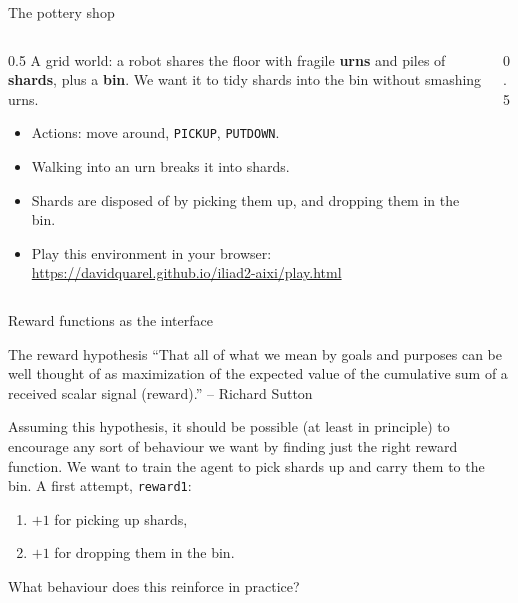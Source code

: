 \begin{frame}{The pottery shop}
\begin{columns}
\begin{column}{0.5\textwidth}
A grid world: a robot shares the floor with fragile \textbf{urns} and piles of \textbf{shards}, 
plus a \textbf{bin}. We want it to tidy shards into the bin without smashing urns.
\begin{itemize}
  \item Actions: move around, \texttt{PICKUP}, \texttt{PUTDOWN}.
  \item Walking into an urn breaks it into shards.
  \item Shards are disposed of by picking them up, and dropping them in the bin.
  \item Play this environment in your browser: \href{https://davidquarel.github.io/iliad2-aixi/play.html}{https://davidquarel.github.io/iliad2-aixi/play.html}
\end{itemize}
\end{column}
\begin{column}{0.5\textwidth}
\centering
{}\\[1ex]
\end{column}
\end{columns}
\end{frame}

\begin{frame}{Reward functions as the interface}

\begin{block}{The reward hypothesis}
  ``That all of what we mean by goals and purposes can be well thought of as maximization of the expected value of the cumulative sum of a received scalar signal (reward).'' -- Richard Sutton
\end{block}
Assuming this hypothesis, it should be possible (at least in principle) to encourage 
any sort of behaviour we want by finding just the right reward function.
\pause
\vfill
We want to train the agent to pick shards up and carry them to the bin.
A first attempt, \texttt{reward1}: 
\begin{enumerate}
\item $+1$ for picking up shards, 
\item $+1$ for dropping them in the bin.
\end{enumerate}
What behaviour does this reinforce in practice?
\end{frame}

